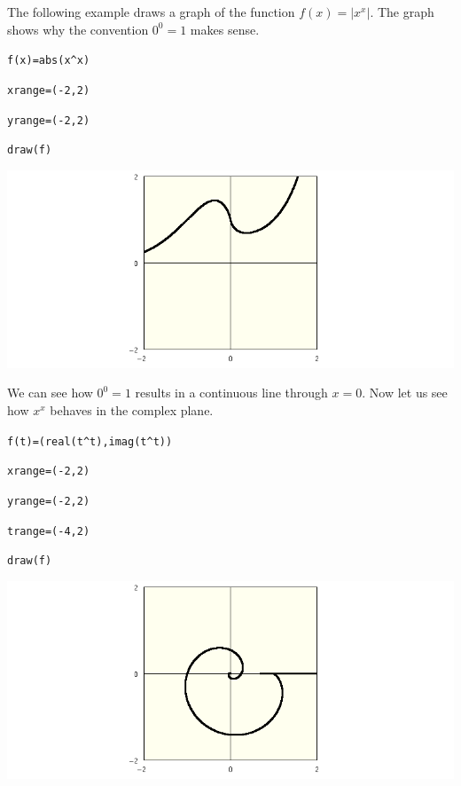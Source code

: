 \noindent
The following example draws a graph of the function $f(x)=|x^x|$.
The graph shows why the convention $0^0=1$ makes sense.

\medskip
\verb$f(x)=abs(x^x)$

\verb$xrange=(-2,2)$

\verb$yrange=(-2,2)$

\verb$draw(f)$

\begin{center}
\includegraphics[scale=0.4]{zerozero.png}
\end{center}

\medskip
\noindent
We can see how $0^0=1$ results in a continuous line through $x=0$.
Now let us see how $x^x$ behaves in the complex plane.

\medskip
\verb$f(t)=(real(t^t),imag(t^t))$

\verb$xrange=(-2,2)$

\verb$yrange=(-2,2)$

\verb$trange=(-4,2)$

\verb$draw(f)$

\begin{center}
\includegraphics[scale=0.4]{zerozero2.png}
\end{center}

